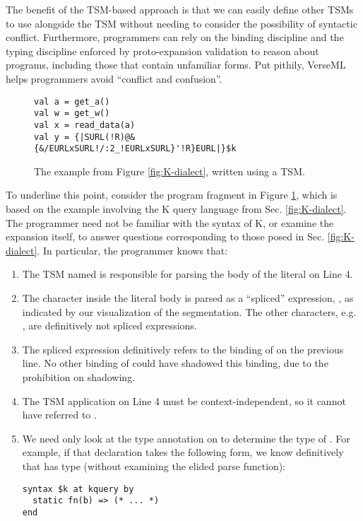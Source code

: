 The benefit of the TSM-based approach is that we can easily define other TSMs to use alongside the  TSM without needing to consider the possibility of syntactic conflict. Furthermore, programmers can rely on the binding discipline and the typing discipline enforced by proto-expansion validation to reason about programs, including those that contain unfamiliar forms. Put pithily, VerseML helps programmers avoid ``conflict and confusion''. 

\begin{figure}
\begin{lstlisting}
val a = get_a()
val w = get_w()
val x = read_data(a)
val y = {|SURL(!R)@&{&/EURLxSURL!/:2_!EURLxSURL}'!R}EURL|}$k
\end{lstlisting}
\caption{The example from Figure \ref{fig:K-dialect}, written using a TSM.}
\label{fig:K-tsms}
\end{figure}

To underline this point, consider the program fragment in Figure \ref{fig:K-tsms}, which is based on the example involving the K query language from Sec. \ref{fig:K-dialect}. The programmer need not be familiar with the syntax of K, or examine the expansion itself, to answer questions corresponding to those posed in Sec. \ref{fig:K-dialect}. In particular, the programmer knows that:
\begin{enumerate}
\item The TSM named  is responsible for parsing the body of the literal on Line 4. 
\item The character  inside the literal body is parsed as a ``spliced'' expression, , as indicated by our visualization of the segmentation. The other characters, e.g. , are definitively not spliced expressions.
\item The spliced expression  definitively refers to the binding of  on the previous line. No other binding of  could have shadowed this binding, due to the prohibition on shadowing.
\item The TSM application on Line 4 must be context-independent, so it cannot have referred to .
\item We need only look at the type annotation on  to determine the type of . For example, if that declaration takes the following form, we know definitively that  has type  (without examining the elided parse function):
\begin{lstlisting}[numbers=none]
syntax $k at kquery by 
  static fn(b) => (* ... *)
end
\end{lstlisting}
\end{enumerate}

